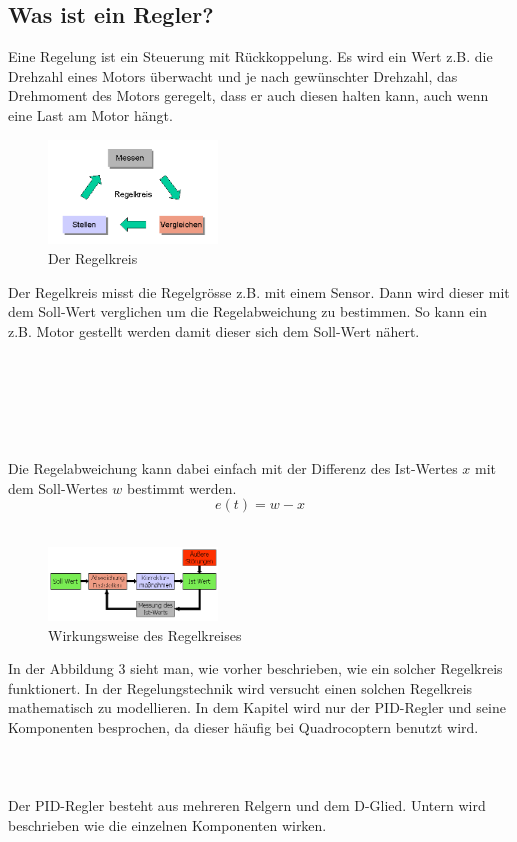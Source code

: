 \documentclass[12pt,a4paper, ngerman]{article}
\begin{document}
\subsection{Was ist ein Regler?}
Eine Regelung ist ein Steuerung mit Rückkoppelung. Es wird ein Wert z.B. die Drehzahl eines Motors überwacht und je nach gewünschter Drehzahl, das Drehmoment des Motors geregelt, dass er auch diesen halten kann, auch wenn eine Last am Motor hängt.\cite{website:rn-wissen_Regelungstechnik}\\
\begin{figure}
\centering
\includegraphics[width=0.4\textwidth]{Regelkreis1.png}
\caption[https://rn-wissen.de/wiki/images/2/25/Regelkreis1.png]{Der Regelkreis}
\end{figure}
Der Regelkreis misst die Regelgrösse z.B. mit einem Sensor. Dann wird dieser mit dem Soll-Wert verglichen um die Regelabweichung zu bestimmen. So kann ein z.B. Motor gestellt werden damit dieser sich dem Soll-Wert nähert.\\ \\ \\ \\ \\ \\ \\
Die Regelabweichung kann dabei einfach mit der Differenz des Ist-Wertes $x$ mit dem Soll-Wertes $w$ bestimmt werden.\cite{website:rn-wissen_Regelungstechnik}
\begin{equation}
e(t)=w-x
\end{equation}\\

\begin{figure}
\centering
\includegraphics[width=0.4\textwidth]{Regelkreis2.png}
\caption[https://rn-wissen.de/wiki/images/5/5d/Regelkreis2.png]{Wirkungsweise des Regelkreises}
\end{figure}
In der Abbildung 3 sieht man, wie vorher beschrieben, wie ein solcher Regelkreis funktionert. In der Regelungstechnik wird versucht einen solchen Regelkreis mathematisch zu modellieren. In dem Kapitel wird nur der PID-Regler und seine Komponenten besprochen, da dieser häufig bei Quadrocoptern benutzt wird.\cite{website:rn-wissen_Regelungstechnik}
\\ \\ \\ \\
Der PID-Regler besteht aus mehreren Relgern und dem D-Glied. Untern wird beschrieben wie die einzelnen Komponenten wirken. 
\newpage
\end{document}
